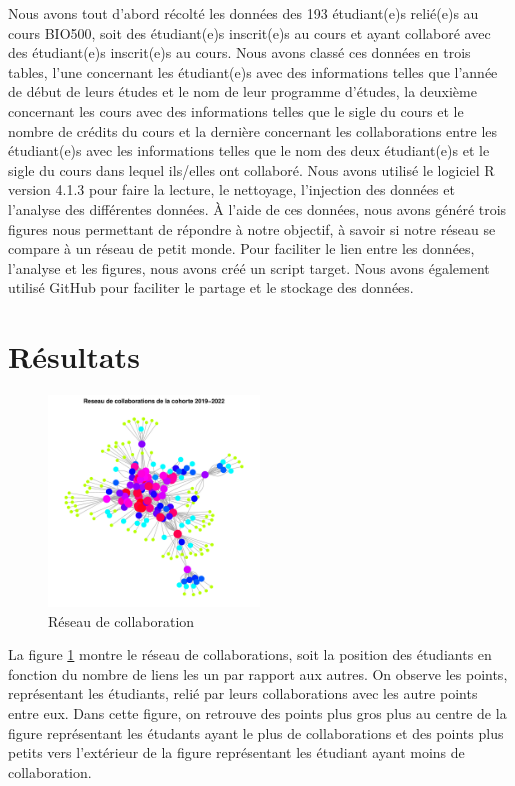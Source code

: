 \documentclass[9pt,twocolumn,twoside,]{pnas-new}
\begin{document}
Nous avons tout d'abord récolté les données des 193 étudiant(e)s
relié(e)s au cours BIO500, soit des étudiant(e)s inscrit(e)s au cours et
ayant collaboré avec des étudiant(e)s inscrit(e)s au cours. Nous avons
classé ces données en trois tables, l'une concernant les étudiant(e)s
avec des informations telles que l'année de début de leurs études et le
nom de leur programme d'études, la deuxième concernant les cours avec
des informations telles que le sigle du cours et le nombre de crédits du
cours et la dernière concernant les collaborations entre les
étudiant(e)s avec les informations telles que le nom des deux
étudiant(e)s et le sigle du cours dans lequel ils/elles ont collaboré.
Nous avons utilisé le logiciel R version 4.1.3 pour faire la lecture, le
nettoyage, l'injection des données et l'analyse des différentes données.
À l'aide de ces données, nous avons généré trois figures nous permettant
de répondre à notre objectif, à savoir si notre réseau se compare à un
réseau de petit monde. Pour faciliter le lien entre les données,
l'analyse et les figures, nous avons créé un script target. Nous avons
également utilisé GitHub pour faciliter le partage et le stockage des
données.

\hypertarget{ruxe9sultats}{%
\section{Résultats}\label{ruxe9sultats}}

\begin{figure}
\centering
\includegraphics[width=0.5\textwidth,height=0.4\textheight]{../results/reseau.pdf}
\caption{Réseau de collaboration \label{fig:plot1}}
\end{figure}

La figure \ref{fig:plot1} montre le réseau de collaborations, soit la
position des étudiants en fonction du nombre de liens les un par rapport
aux autres. On observe les points, représentant les étudiants, relié par
leurs collaborations avec les autre points entre eux. Dans cette figure,
on retrouve des points plus gros plus au centre de la figure
représentant les étudants ayant le plus de collaborations et des points
plus petits vers l'extérieur de la figure représentant les étudiant
ayant moins de collaboration.
\end{document}
